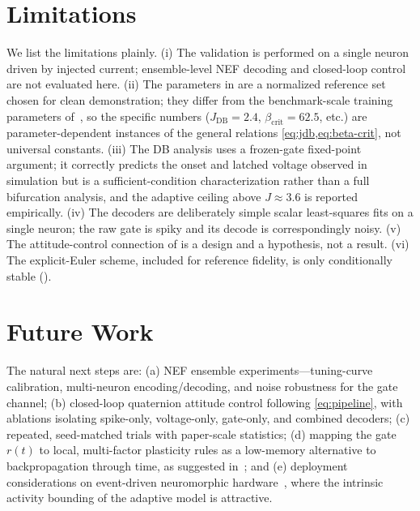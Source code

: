 \documentclass[journal]{IEEEtran}
\newcommand{\Jdb}{J_{\mathrm{DB}}}
\begin{document}
\section{Limitations}\label{sec:limitations}
We list the limitations plainly. (i) The validation is performed on a single
neuron driven by injected current; ensemble-level NEF decoding and closed-loop
control are not evaluated here. (ii) The parameters in  are a
normalized reference set chosen for clean demonstration; they differ from the
benchmark-scale training parameters of~\cite{hyperlif_theory}, so the specific
numbers ($\Jdb=2.4$, $\beta_{\mathrm{crit}}=62.5$, etc.) are parameter-dependent
instances of the general relations \cref{eq:jdb,eq:beta-crit}, not universal
constants. (iii) The DB analysis uses a frozen-gate fixed-point argument; it
correctly predicts the onset and latched voltage observed in simulation but is a
sufficient-condition characterization rather than a full bifurcation analysis,
and the adaptive ceiling above $J\approx 3.6$ is reported empirically. (iv) The
decoders are deliberately simple scalar least-squares fits on a single neuron;
the raw gate is spiky and its decode is correspondingly noisy. (v) The
attitude-control connection of  is a design and a hypothesis,
not a result. (vi) The explicit-Euler scheme, included for reference fidelity,
is only conditionally stable ().

\section{Future Work}\label{sec:future}
The natural next steps are: (a) NEF ensemble experiments---tuning-curve
calibration, multi-neuron encoding/decoding, and noise robustness for the gate
channel; (b) closed-loop quaternion attitude control following
\cref{eq:pipeline}, with ablations isolating spike-only, voltage-only,
gate-only, and combined decoders; (c) repeated, seed-matched trials with
paper-scale statistics; (d) mapping the gate $r(t)$ to local, multi-factor
plasticity rules as a low-memory alternative to backpropagation through time, as
suggested in~\cite{hyperlif_theory}; and (e) deployment considerations on
event-driven neuromorphic hardware~\cite{davies2018loihi}, where the intrinsic
activity bounding of the adaptive model is attractive.
\end{document}
